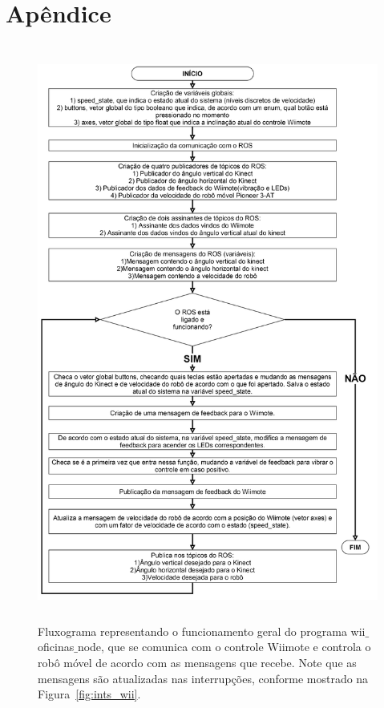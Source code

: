 \documentclass[a4paper,11pt]{article}
\begin{document}
\section*{Apêndice}
	\begin{figure}[h]
	\centering
  		\includegraphics[height=19cm]{images/wii_oficinas_node_flux.png} 
		\caption{\small{Fluxograma representando o funcionamento geral do programa wii$\_$oficinas$\_$node, que se comunica com o controle Wiimote e controla o robô móvel de acordo com as mensagens que recebe. Note que as mensagens são atualizadas nas interrupções, conforme mostrado na Figura~\ref{fig:ints_wii}.}}
		\label{fig:wii_oficinas_node_flux}
	\end{figure}
	
\end{document}
